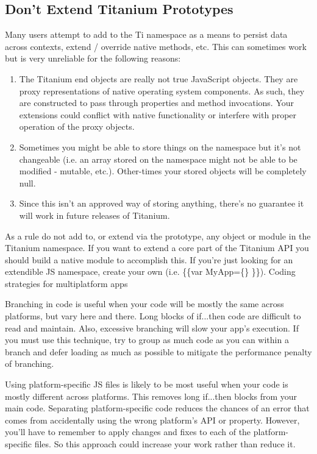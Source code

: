 \documentclass[11pt]{book}
\begin{document}
\subsection{Don't Extend Titanium Prototypes}
Many users attempt to add to the Ti namespace as a means to persist data across contexts, extend / override native methods, etc. This can sometimes work but is very unreliable for the following reasons:
\begin{enumerate}
    \item The Titanium end objects are really not true JavaScript objects. They are proxy representations of native operating system components. As such, they are constructed to pass through properties and method invocations. Your extensions could conflict with native functionality or interfere with proper operation of the proxy objects.
    \item Sometimes you might be able to store things on the namespace but it's not changeable (i.e. an array stored on the namespace might not be able to be modified - mutable, etc.). Other-times your stored objects will be completely null.
    \item Since this isn't an approved way of storing anything, there's no guarantee it will work in future releases of Titanium.
\end{enumerate}

As a rule do not add to, or extend via the prototype, any object or module in the Titanium namespace. If you want to extend a core part of the Titanium API you should build a native module to accomplish this. If you're just looking for an extendible JS namespace, create your own (i.e. \{\{var MyApp=\{\} \}\}).
Coding strategies for multiplatform apps

Branching in code is useful when your code will be mostly the same across platforms, but vary here and there. Long blocks of if...then code are difficult to read and maintain. Also, excessive branching will slow your app's execution. If you must use this technique, try to group as much code as you can within a branch and defer loading as much as possible to mitigate the performance penalty of branching.

Using platform-specific JS files is likely to be most useful when your code is mostly different across platforms. This removes long if...then blocks from your main code. Separating platform-specific code reduces the chances of an error that comes from accidentally using the wrong platform's API or property. However, you'll have to remember to apply changes and fixes to each of the platform-specific files. So this approach could increase your work rather than reduce it. 
\end{document}
